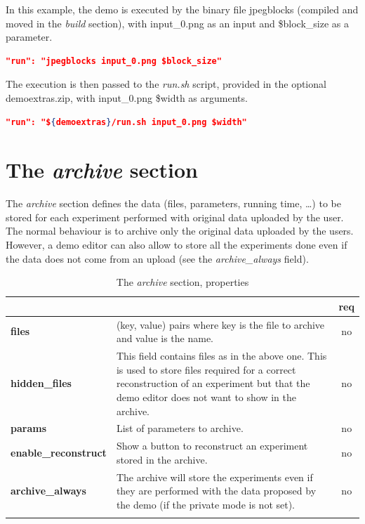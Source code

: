 In this example, the demo is executed by the binary file jpegblocks (compiled and moved in the \emph{build} section), with input\_0.png as an input and \$block\_size as a parameter.
\begin{lstlisting}[language=json,firstnumber=1]
  "run": "jpegblocks input_0.png $block_size"\end{lstlisting}

The execution is then passed to the \emph{run.sh} script, provided in the optional demoextras.zip, with input\_0.png \$width as arguments.
\begin{lstlisting}[language=json,firstnumber=1]
  "run": "${demoextras}/run.sh input_0.png $width"
\end{lstlisting}


\section{The \emph{archive} section}

The \emph{archive} section defines the data (files, parameters, running time, \dots) to be stored for each experiment performed with original data uploaded by the user. The normal behaviour is to archive only the original data uploaded by the users. However, a demo editor can also allow to store all the experiments done even if the data does not come from an upload (see the \emph{archive\_always} field).

\begin{longtable}{|>{\bf}L{\linewidth}|L{\linewidth}|c|}
\hline
{}     &  & {\bf req} \tabularnewline 
\hline \hline
 files    & (key, value) pairs where key is the file to archive and value is the name. & no \\ \hline
hidden\_files    & This field contains files as in the above one. This is used to store files required for a correct reconstruction of an experiment but that the demo editor does not want to show in the archive. & no \\ \hline            
 params  & List of parameters to archive. & no \\ \hline
 enable\_reconstruct & Show a button to reconstruct an experiment stored in the archive. & no \\ \hline
 archive\_always     & The archive will store the experiments even if they are performed with the data proposed by the demo (if the private mode is not set). & no \\ \hline
\caption{The \emph{archive} section, properties}
\end{longtable}


